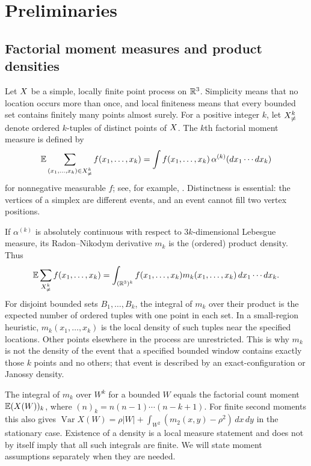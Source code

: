 \section{Preliminaries}
\label{sec:prelim}

\subsection{Factorial moment measures and product densities}

Let $X$ be a simple, locally finite point process on $\mathbb R^3$. Simplicity means that no location occurs more than once, and local finiteness means that every bounded set contains finitely many points almost surely. For a positive integer $k$, let $X^k_{\ne}$ denote ordered $k$-tuples of distinct points of $X$. The $k$th factorial moment measure is defined by
\begin{equation}
 \mathbb E\sum_{(x_1,\ldots,x_k)\in X^k_{\ne}} f(x_1,\ldots,x_k)
 =\int f(x_1,\ldots,x_k)\,\alpha^{(k)}(d x_1\cdots d x_k)
 \label{eq:factorial-measure}
\end{equation}
for nonnegative measurable $f$; see, for example, \citet{daleyVereJones2008}. Distinctness is essential: the vertices of a simplex are different events, and an event cannot fill two vertex positions.

If $\alpha^{(k)}$ is absolutely continuous with respect to $3k$-dimensional Lebesgue measure, its Radon--Nikodym derivative $m_k$ is the (ordered) product density. Thus
\begin{equation}
 \mathbb E\sum_{X^k_{\ne}} f(x_1,\ldots,x_k)
 =\int_{(\mathbb R^3)^k} f(x_1,\ldots,x_k)m_k(x_1,\ldots,x_k)\,d x_1\cdots d x_k.
 \label{eq:campbell}
\end{equation}
For disjoint bounded sets $B_1,\ldots,B_k$, the integral of $m_k$ over their product is the expected number of ordered tuples with one point in each set. In a small-region heuristic, $m_k(x_1,\ldots,x_k)$ is the local density of such tuples near the specified locations. Other points elsewhere in the process are unrestricted. This is why $m_k$ is not the density of the event that a specified bounded window contains exactly those $k$ points and no others; that event is described by an exact-configuration or Janossy density.

The integral of $m_k$ over $W^k$ for a bounded $W$ equals the factorial count moment $\mathbb E(X(W))_k$, where $(n)_k=n(n-1)\cdots(n-k+1)$. For finite second moments this also gives $\operatorname{Var}X(W)=\rho|W|+\int_{W^2}(m_2(x,y)-\rho^2)\,dx\,dy$ in the stationary case. Existence of a density is a local measure statement and does not by itself imply that all such integrals are finite. We will state moment assumptions separately when they are needed.

